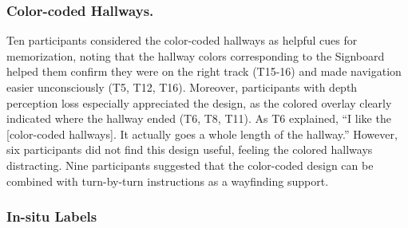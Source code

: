 \subsubsection{Color-coded Hallways.} Ten participants considered the color-coded hallways as helpful cues for memorization, noting that the hallway colors corresponding to the Signboard helped them confirm they were on the right track (T15-16) and made navigation easier unconsciously (T5, T12, T16). Moreover, participants with depth perception loss especially appreciated the design, as the colored overlay clearly indicated where the hallway ended (T6, T8, T11). As T6 explained, ``I like the [color-coded hallways]. It actually goes a whole length of the hallway.'' However, six participants did not find this design useful, feeling the colored hallways distracting. Nine participants suggested that the color-coded design can be combined with turn-by-turn instructions as a wayfinding support.%



\subsubsection{In-situ Labels}
\label{In-situ labels}

